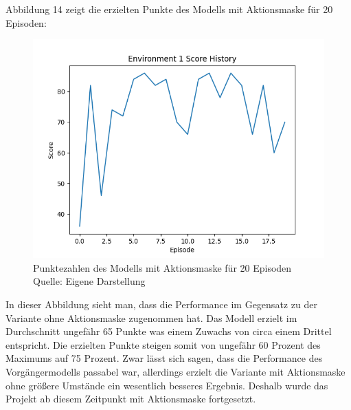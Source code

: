 Abbildung 14 zeigt die erzielten Punkte des Modells mit Aktionsmaske für 20 Episoden:
\nopagebreak
\begin{figure}[H]
	\includegraphics[width=1\textwidth]{Bilder/trainingwithactionmask} 
	\caption[Punktezahlen des Modells mit Aktionsmaske für 20 Episoden]{Punktezahlen des Modells mit Aktionsmaske für 20 Episoden\\ Quelle: Eigene Darstellung}
\end{figure}

In dieser Abbildung sieht man, dass die Performance im Gegensatz zu der Variante ohne Aktionsmaske zugenommen hat. Das Modell erzielt im Durchschnitt ungefähr 65 Punkte was einem Zuwachs von circa einem Drittel entspricht. Die erzielten Punkte steigen somit von ungefähr 60 Prozent des Maximums auf 75 Prozent. Zwar lässt sich sagen, dass die Performance des Vorgängermodells passabel war, allerdings erzielt die Variante mit Aktionsmaske ohne größere Umstände ein wesentlich besseres Ergebnis. Deshalb wurde das Projekt ab diesem Zeitpunkt mit Aktionsmaske fortgesetzt.
